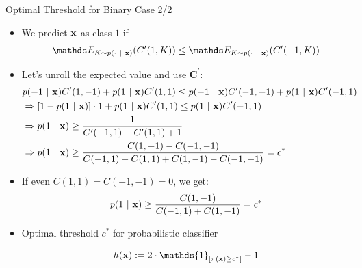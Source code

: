 \documentclass[11pt,compress,t,notes=noshow, xcolor=table]{beamer}
\begin{document}
\begin{frame}{Optimal Threshold for Binary Case 2/2}
            \begin{itemize}
            \item We predict $\mathbf{x}$ as class $1$ if 
            \begin{align*}
                \E_{K \sim p(\cdot ~|~ \xv)}( C^\prime(1,K) )  \leq \E_{K \sim p(\cdot ~|~ \xv)}( C^\prime(-1,K) ) \\
            \end{align*}

			\item Let's unroll the expected value and use $\mathbf{C}^\prime$:
            \footnotesize{
    			\begin{align*}	
                    & p(-1 ~|~ \mathbf{x} ) C^\prime(1,-1)  + 	p(1 ~|~ \mathbf{x} ) C^\prime(1,1) \leq  p(-1 ~|~ \mathbf{x} ) C^\prime(-1,-1)  + 	p(1 ~|~ \mathbf{x} ) C^\prime(-1,1)  \\ 
                    &\Rightarrow [1 - p(1 ~|~ \mathbf{x})] \cdot 1 + p(1 ~|~ \mathbf{x}) C^\prime(1, 1) \leq p(1 ~|~ \mathbf{x}) C^\prime(-1, 1) \\
                    &\Rightarrow p(1 ~|~ \mathbf{x}) \geq \frac{1}{C^\prime(-1, 1) - C^\prime(1, 1) + 1} \\
                    &\Rightarrow p(1 ~|~ \mathbf{x}) \geq \frac{C(1, -1) - C(-1, -1)}{C(-1, 1) - C(1, 1) + C(1, -1) - C(-1, -1)} = c^*
    			\end{align*}
            }
		
            \item If even $C(1, 1) = C(-1, -1) = 0 $, we get:
            \begin{align*}
                p(1 ~|~ \mathbf{x}) \geq \frac{C(1, -1)}{C(-1, 1) + C(1, -1)} = c^{*}
            \end{align*}	
            
            \item Optimal threshold $c^*$ for probabilistic classifier 
            
            $$   \hx := 2 \cdot \mathds{1}_{[ \pi(\xv) \geq c^*]} -1 $$
							
		\end{itemize}
\end{frame}
\end{document}
